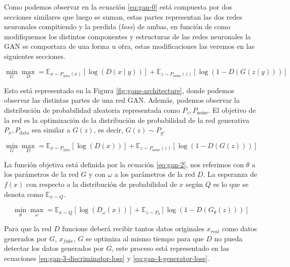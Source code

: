 
Como podemos observar en la ecuación \ref{eq:gan-0} está compuesta por dos secciones similares que luego se suman, estas partes representan las dos redes neuronales compitiendo y la perdida (\textit{loss}) de ambas, en función de como modifiquemos los distintos componentes y estructuras de las redes neuronales la \gls{GAN} se comportara de una forma u otra, estas modificaciones las veremos en las siguientes secciones.

\begin{equation}
    \min_{G}\max_{D} = \mathbb{E}_{x\sim{}P_{\text{data}}(x)} \left[\log\left(D(x\mid{}y)\right)\right] + \mathbb{E}_{z\sim{}P_{\text{noise}}(z)} \left[\log\left(1-D(G(z\mid{}y))\right)\right]
    \label{eq:gan-0}
\end{equation}

Esto está representado en la Figura \ref{fig:gans-architecture}, donde podemos observar las distintas partes de una red \gls{GAN}. Además, podemos observar la distribución de probabilidad aleatoria representada como ${P_{z}, P_{\text{noise}}}$. El objetivo de la red es la optimización de la distribución de probabilidad de la red generativa ${P_{x}, P_{\text{data}}}$ sea similar a ${G(z)}$, es decir, ${G(z)\sim{}P_{g}}$.

\begin{equation}
    \min_{G}\max_{D} = \mathbb{E}_{x\sim{}P_{\text{data}}} \left[\log\left(D(x)\right)\right] + \mathbb{E}_{z\sim{}P_{\text{noise}}(z)} \left[\log\left(1-D(G(z))\right)\right]
    \label{eq:gan-1}
\end{equation}

La función objetiva está definida por la ecuación \ref{eq:gan-2}, nos referimos con ${\theta}$ a los parámetros de la red ${G}$ y con ${\omega}$ a los parámetros de la red ${D}$. La esperanza de ${f(x)}$ con respecto a la distribución de probabilidad de ${x}$ según ${Q}$ es lo que se denota como ${\mathbb{E}_{x \sim Q}}$.

\begin{equation}
    \min_{\theta}\max_{\omega} = \mathbb{E}_{x\sim{}Q} \left[\log\left(D_{\omega}(x)\right)\right] + \mathbb{E}_{z \sim{}P_{\theta}} \left[\log\left(1-D(G_{\theta}(z))\right)\right]
    \label{eq:gan-2}
\end{equation}

Para que la red ${D}$ funcione deberá recibir tantos datos originales ${x_{real}}$ como datos generados por ${G}$, ${x_{fake}}$, ${G}$ se optimiza al mismo tiempo para que ${D}$ no pueda detectar los datos generados por ${G}$, este proceso está representado en las ecuaciones \ref{eq:gan-3-discriminator-loss} y \ref{eq:gan-4-generator-loss}.

